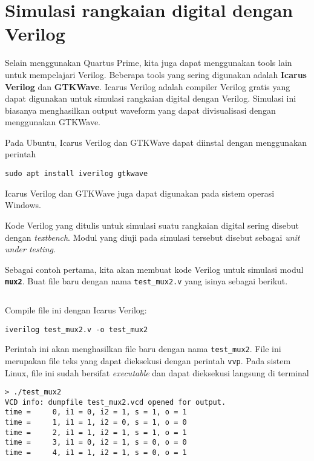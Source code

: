 \section{Simulasi rangkaian digital dengan Verilog}

Selain menggunakan Quartus Prime, kita juga dapat menggunakan tools lain untuk
mempelajari Verilog. Beberapa tools yang sering digunakan
adalah \textbf{Icarus Verilog} dan \textbf{GTKWave}. Icarus
Verilog adalah compiler Verilog gratis yang dapat digunakan
untuk simulasi rangkaian digital dengan Verilog. Simulasi ini
biasanya menghasilkan output waveform yang dapat divisualisasi dengan
menggunakan GTKWave.

Pada Ubuntu, Icarus Verilog dan GTKWave dapat diinstal dengan menggunakan perintah
\begin{verbatim}
sudo apt install iverilog gtkwave
\end{verbatim}
Icarus Verilog dan GTKWave juga dapat digunakan pada sistem operasi Windows.

Kode Verilog yang ditulis untuk simulasi suatu rangkaian digital sering
disebut dengan \textit{textbench}. Modul yang diuji pada simulasi tersebut
disebut sebagai \textit{unit under testing}.

Sebagai contoh pertama, kita akan membuat kode Verilog untuk simulasi
modul {\tt\textbf{mux2}}. Buat file baru dengan nama {\tt test\_mux2.v}
yang isinya sebagai berikut.
\begin{mdframed}[backgroundcolor=mintedbg]
{
\inputminted[breaklines,fontsize=\small]{verilog}{codes/test_mux2.v}
}\end{mdframed}

Compile file ini dengan Icarus Verilog:
\begin{verbatim}
iverilog test_mux2.v -o test_mux2
\end{verbatim}

Perintah ini akan menghasilkan file baru dengan nama {\tt\small test\_mux2}.
File ini merupakan file teks yang dapat dieksekusi dengan perintah {\tt vvp}.
Pada sistem Linux, file ini sudah bersifat \textit{executable} dan dapat dieksekusi
langsung di terminal
\begin{verbatim}
> ./test_mux2
VCD info: dumpfile test_mux2.vcd opened for output.
time =     0, i1 = 0, i2 = 1, s = 1, o = 1
time =     1, i1 = 1, i2 = 0, s = 1, o = 0
time =     2, i1 = 1, i2 = 1, s = 1, o = 1
time =     3, i1 = 0, i2 = 1, s = 0, o = 0
time =     4, i1 = 1, i2 = 1, s = 0, o = 1
\end{verbatim}



